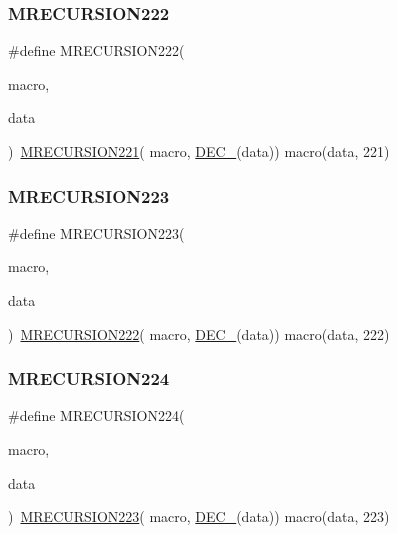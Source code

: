 \subsubsection{\texorpdfstring{MRECURSION222}{MRECURSION222}}
{\footnotesize\ttfamily \#define M\+R\+E\+C\+U\+R\+S\+I\+O\+N222(\begin{DoxyParamCaption}\item[{}]{macro,  }\item[{}]{data }\end{DoxyParamCaption})~\mbox{\hyperlink{group__group__sam0__utils__mrecursion_gab39c3f39c867806b04c6e4b5afe65fb8}{M\+R\+E\+C\+U\+R\+S\+I\+O\+N221}}(  macro, \mbox{\hyperlink{group__group__sam0__utils__mrecursion_ga1d23d683797679dca8c3512a54a5dcae}{D\+E\+C\+\_\+}}(data))   macro(data, 221)}

\mbox{\label{group__group__sam0__utils__mrecursion_ga0ea3f60a2517a10616b7a00e57722636}} 
\subsubsection{\texorpdfstring{MRECURSION223}{MRECURSION223}}
{\footnotesize\ttfamily \#define M\+R\+E\+C\+U\+R\+S\+I\+O\+N223(\begin{DoxyParamCaption}\item[{}]{macro,  }\item[{}]{data }\end{DoxyParamCaption})~\mbox{\hyperlink{group__group__sam0__utils__mrecursion_gaa0d5577f93a6d507f684b144d77d3ada}{M\+R\+E\+C\+U\+R\+S\+I\+O\+N222}}(  macro, \mbox{\hyperlink{group__group__sam0__utils__mrecursion_ga1d23d683797679dca8c3512a54a5dcae}{D\+E\+C\+\_\+}}(data))   macro(data, 222)}

\mbox{\label{group__group__sam0__utils__mrecursion_ga5d2b86c40ce9218629a8c46d94f34206}} 
\subsubsection{\texorpdfstring{MRECURSION224}{MRECURSION224}}
{\footnotesize\ttfamily \#define M\+R\+E\+C\+U\+R\+S\+I\+O\+N224(\begin{DoxyParamCaption}\item[{}]{macro,  }\item[{}]{data }\end{DoxyParamCaption})~\mbox{\hyperlink{group__group__sam0__utils__mrecursion_ga0ea3f60a2517a10616b7a00e57722636}{M\+R\+E\+C\+U\+R\+S\+I\+O\+N223}}(  macro, \mbox{\hyperlink{group__group__sam0__utils__mrecursion_ga1d23d683797679dca8c3512a54a5dcae}{D\+E\+C\+\_\+}}(data))   macro(data, 223)}

